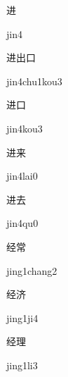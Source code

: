 \begin{verbete}[jin4]{进}
\begin{pronuncia}{jin4}
\end{pronuncia}
\end{verbete}

\begin{verbete}{进出口}
\begin{pronuncia}{jin4chu1kou3}
\end{pronuncia}
\end{verbete}

\begin{verbete}{进口}
\begin{pronuncia}{jin4kou3}
\end{pronuncia}
\end{verbete}

\begin{verbete}{进来}
\begin{pronuncia}{jin4lai0}
\end{pronuncia}
\end{verbete}

\begin{verbete}[jin4qu0]{进去}
\begin{pronuncia}{jin4qu0}
\end{pronuncia}
\end{verbete}

\begin{verbete}{经常}
\begin{pronuncia}{jing1chang2}
\end{pronuncia}
\end{verbete}

\begin{verbete}[jing1ji4]{经济}
\begin{pronuncia}{jing1ji4}
\end{pronuncia}
\end{verbete}

\begin{verbete}[jing1li3]{经理}
\begin{pronuncia}{jing1li3}
\end{pronuncia}
\end{verbete}

